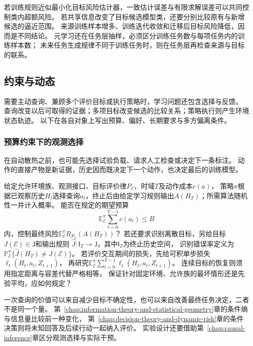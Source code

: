 若训练规则近似最小化目标风险估计器，一致估计误差与有限求解误差可以共同控制类内超额风险。
若共享信息改变了目标候选模型类，还要分别比较原有与新增候选的逼近范围。
来源训练样本增多、训练迭代收敛和迁移后目标风险降低，因而是不同结论。
元学习还在任务层抽样，必须区分训练任务数与每项任务内的训练样本数；
未来任务生成规律不同于训练任务时，则在任务层再检查来源与目标的联系。

\subsection{约束与动态}
\label{sec:future-feedback-theory-map}

需要主动查询、兼顾多个评价目标或执行策略时，学习问题还包含选择与反馈。
查询改变以后可取得的证据；多项目标改变候选的比较关系；策略执行则产生环境状态轨迹。
以下在各自对象上写出预算、偏好、长期要求与多方偏离条件。

\subsubsection{预算约束下的观测选择}
\label{sec:future-analysis-information-acquisition}

在自动散热之前，也可能先选择试验负载、请求人工检查或决定下一条标注。
动作的直接产物是新证据，历史因而既决定下一个动作，也决定最后的训练模型。

\begin{mathproblem}[观测选择策略的信息收益与代价]
  \label{question:future-information-acquisition}
  给定允许环境族、观测接口、目标评价律$P_{\mathcal E}$、时域$T$及动作成本$c(a)$，
  策略$\pi$根据已观察历史$H_t$选择查询$a_t$，终止后由给定学习规则输出$A(H_T)$；所需算法随机性一并计入概率。
  能否在规定的期望预算
  \[
    \mathbb E_{\mathcal E}^{\pi}\sum_{t=0}^{T-1}c(a_t)\leq B
  \]
  内，控制最终风险$\mathbb E_{\mathcal E}^{\pi}R_{P_{\mathcal E}}(A(H_T))$？
  若还要求识别离散目标，另给目标$J(\mathcal E)\in\mathsf J$和输出规则
  $\widehat J:\mathsf I_T\to\mathsf J$，其中$\mathsf I_T$为终止历史空间，
  识别错误率定义为$\mathbb P_{\mathcal E}^{\pi}\{\widehat J(H_T)\ne J(\mathcal E)\}$。
  若评价交互期间的损失，先给可积单步损失$\ell_t(H_t,a_t,Z_{t+1})$，
  再研究$\mathbb E_{\mathcal E}^{\pi}\sum_{t=0}^{T-1}\ell_t(H_t,a_t,Z_{t+1})$。
  连续目标的恢复则须用指定距离与容差代替严格相等。
  保证针对固定环境、允许族的最坏情形还是先验平均，应如何规定？
\end{mathproblem}

一次查询的价值可以来自减少目标不确定性，也可以来自改善最终任务决定，二者不是同一个量。
第~\ref{chap:information-theory-and-statistical-geometry}章的条件熵与信息量比较前一种变化，
第~\ref{chap:decision-theory-and-dynamic-risk}章的条件决策则将未知回答及后续行动一起纳入评价。
实验设计还要借助第~\ref{chap:causal-inference}章区分观测选择与实际干预。

